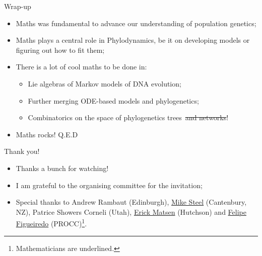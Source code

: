 \begin{frame}{Wrap-up}
 \begin{itemize}
  \item Maths was fundamental to advance our understanding of population genetics;\pause
  \item Maths plays a central role in Phylodynamics, be it on developing models or figuring out how to fit them;\pause
  \item There is a lot of cool maths to be done in:\pause
  \begin{itemize}
   \item Lie algebras of Markov models of DNA evolution;
   \item Further merging ODE-based models and phylogenetics;
   \item[\tikzmark{bl}\textbullet] Combinatorics on the space of phylogenetics trees~\sout{and networks}!
  \end{itemize}
  \pause
  \item Maths rocks! Q.E.D
 \end{itemize}
\end{frame}
\begin{frame}{Thank you!}
\begin{itemize}
 \item Thanks a bunch for watching!
 \item I am grateful to the organising committee for the invitation;
 \item Special thanks to Andrew Rambaut (Edinburgh), \underline{Mike Steel} (Cantenbury, NZ), Patrice Showers Corneli (Utah), \underline{Erick Matsen} (Hutchson) and \underline{Felipe Figueiredo} (PROCC)\footnote{Mathematicians are underlined.}.
\end{itemize}
\end{frame}
